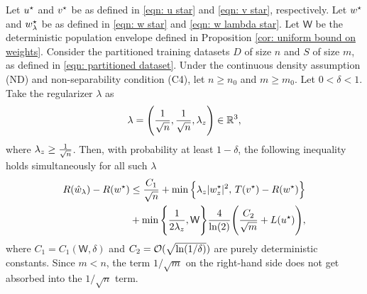 \begin{thm}\label{thm: main theorem}
    Let $u^\star$ and $v^\star$ be as defined in \eqref{eqn: u star} and \eqref{eqn: v star}, respectively. Let $w^\star$ and $w^\star_{\lambda}$ be as defined in \eqref{eqn: w star} and \eqref{eqn: w lambda star}. Let $\mathsf{W}$ be the deterministic population envelope defined in Proposition \ref{cor: uniform bound on weights}.
Consider the partitioned training datasets $D$ of size $n$ and $S$ of size $m$, as defined in \eqref{eqn: partitioned dataset}. Under the continuous density assumption (ND) and non-separability condition (C4), let $n \ge n_0$ and $m \ge m_0$. Let $0<\delta<1$. Take the regularizer $\lambda$ as
\begin{equation*}
    \lambda = \Bigg(\frac{1}{\sqrt{n}}, \frac{1}{\sqrt{n}}, \lambda_z\Bigg) \in \mathbb{R}^{3},
\end{equation*}
where $\lambda_z \geq \frac{1}{\sqrt{n}}$. Then, with probability at least $1-\delta$, the following inequality holds simultaneously for all such $\lambda$
   \begin{equation}\label{eqn: main equation}
        \begin{aligned}
            R(\hat{w}_\lambda) - R(w^\star) &\leq \frac{C_1}{\sqrt{n}} +
            \min\Big\{\lambda_z|w^\star_z|^2,\,
            T(v^\star)-R(w^\star)\Big\} \\
            &+
            \min\Bigg\{\frac{1}{2\lambda_z},\mathsf{W}\Bigg\}\frac{4}{\ln(2)}\Bigg(\frac{C_2}{\sqrt{m}} + L(u^\star)\Bigg),
        \end{aligned}  
    \end{equation}
    where $C_1=C_1(\mathsf W,\delta)$ and $C_2 = \mathcal{O}( \sqrt{\ln(1/\delta)} )$ are purely deterministic constants. Since $m < n$, the term $1/\sqrt{m}$ on the right-hand side does not get absorbed into the $1/\sqrt{n}$ term.
\end{thm}


